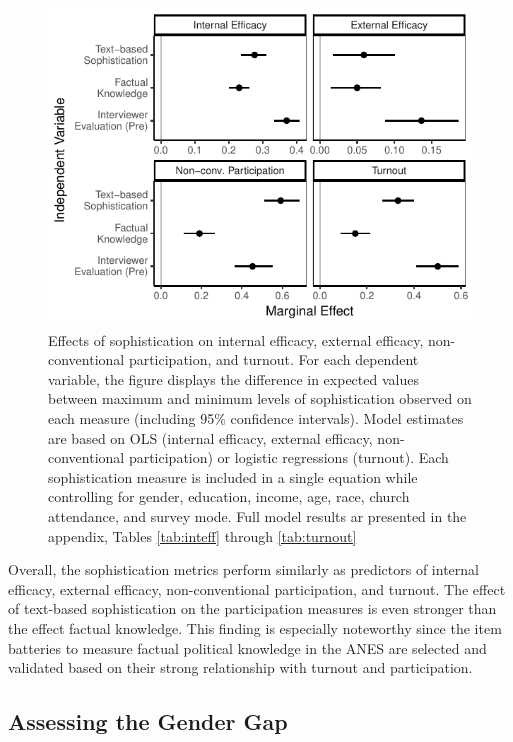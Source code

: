 \documentclass[12pt]{article}
\begin{document}
\begin{figure}[h]\centering
\includegraphics{../fig/knoweff_pres.pdf}
\caption{Effects of sophistication on internal efficacy, external efficacy, non-conventional participation, and turnout. For each dependent variable, the figure displays the difference in expected values between maximum and minimum levels of sophistication observed on each measure (including 95\% confidence intervals). Model estimates are based on OLS (internal efficacy, external efficacy, non-conventional participation) or logistic regressions (turnout). Each sophistication measure is included in a single equation while controlling for gender, education, income, age, race, church attendance, and survey mode. Full model results ar presented in the appendix, Tables \ref{tab:inteff} through \ref{tab:turnout}}\label{fig:knoweff}
\end{figure}

Overall, the sophistication metrics perform similarly as predictors of internal efficacy, external efficacy, non-conventional participation, and turnout. The effect of text-based sophistication on the participation measures is even stronger than the effect factual knowledge. This finding is especially noteworthy since the item batteries to measure factual political knowledge in the ANES are selected and validated based on their strong relationship with turnout and participation. 

\subsection*{Assessing the Gender Gap}
\end{document}
